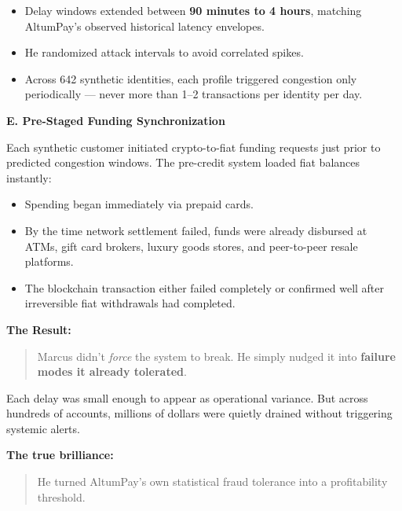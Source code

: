 \begin{itemize}
    \item Delay windows extended between \textbf{90 minutes to 4 hours}, matching AltumPay’s observed historical latency envelopes.
    \item He randomized attack intervals to avoid correlated spikes.
    \item Across 642 synthetic identities, each profile triggered congestion only periodically --- never more than 1--2 transactions per identity per day.
\end{itemize}

\medskip

\textbf{E. Pre-Staged Funding Synchronization}

Each synthetic customer initiated crypto-to-fiat funding requests just prior to predicted congestion windows. The pre-credit system loaded fiat balances instantly:

\begin{itemize}
    \item Spending began immediately via prepaid cards.
    \item By the time network settlement failed, funds were already disbursed at ATMs, gift card brokers, luxury goods stores, and peer-to-peer resale platforms.
    \item The blockchain transaction either failed completely or confirmed well after irreversible fiat withdrawals had completed.
\end{itemize}

\medskip

\textbf{The Result:}

\begin{quote}
Marcus didn't \textit{force} the system to break.  
He simply nudged it into \textbf{failure modes it already tolerated}.  
\end{quote}

Each delay was small enough to appear as operational variance.  
But across hundreds of accounts, millions of dollars were quietly drained without triggering systemic alerts.

\medskip

\textbf{The true brilliance:}

\begin{quote}
He turned AltumPay's own statistical fraud tolerance into a profitability threshold.
\end{quote}

